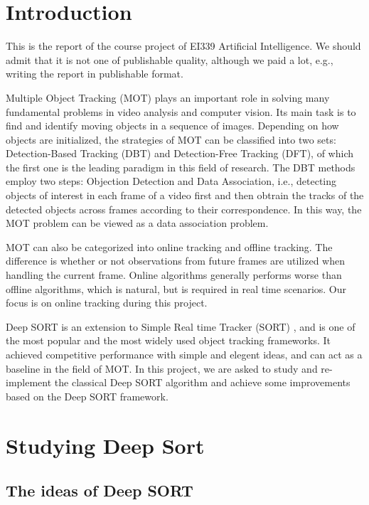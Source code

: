\documentclass[conference]{IEEEtran}
\begin{document}



\section{Introduction}

This is the report of the course project of EI339 Artificial Intelligence. We should admit that it is not one of publishable quality, although we paid a lot, e.g., writing the report in publishable format.

Multiple Object Tracking (MOT) plays an important role in solving many fundamental problems in video analysis and computer vision. Its main task is to find and identify moving objects in a sequence of images. Depending on how objects are initialized, the strategies of MOT can be classified into two sets: Detection-Based Tracking (DBT) and Detection-Free Tracking (DFT), of which the first one is the leading paradigm in this field of research. The DBT methods employ two steps: Objection Detection and Data Association, i.e., detecting objects of interest in each frame of a video first and then obtrain the tracks of the detected objects across frames according to their correspondence. In this way, the MOT problem can be viewed as a data association problem.

MOT can also be categorized into online tracking and offline tracking. The difference is whether or not observations from future frames are utilized when handling the current frame. Online algorithms generally performs worse than offline algorithms, which is natural, but is required in real time scenarios. Our focus is on online tracking during this project.

Deep SORT \cite{Wojke2017simple} is an extension to Simple Real time Tracker (SORT) \cite{Bewley2016_sort}, and is one of the most popular and the most widely used object tracking frameworks. It achieved competitive performance with simple and elegent ideas, and can act as a baseline in the field of MOT. In this project, we are asked to study and re-implement the classical Deep SORT algorithm and achieve some improvements based on the Deep SORT framework.

\section{Studying Deep Sort}

\subsection{The ideas of Deep SORT}
\end{document}
